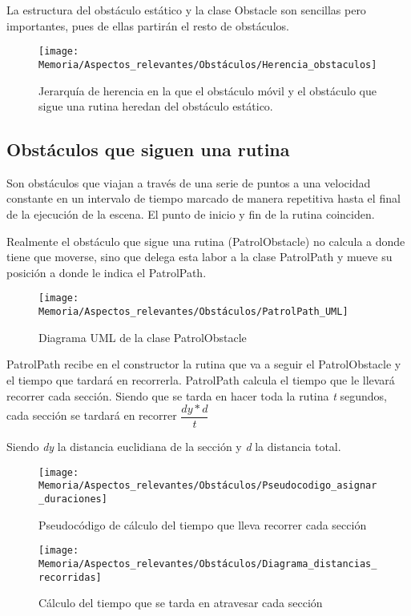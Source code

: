 La estructura del obstáculo estático y la clase Obstacle son sencillas pero importantes, pues de ellas partirán el resto de obstáculos.

\begin{figure}[h]
\centering
\texttt{[image: Memoria/Aspectos\_relevantes/Obstáculos/Herencia\_obstaculos]}
\caption{Jerarquía de herencia en la que el obstáculo móvil y el obstáculo que sigue una rutina heredan del obstáculo estático.}
\end{figure}

\subsection{Obstáculos que siguen una rutina}
Son obstáculos que viajan a través de una serie de puntos a una velocidad constante en un intervalo de tiempo marcado de manera repetitiva hasta el final de la ejecución de la escena. El punto de inicio y fin de la rutina coinciden. 

Realmente el obstáculo que sigue una rutina (PatrolObstacle) no calcula a donde tiene que moverse, sino que delega esta labor a la clase PatrolPath y mueve su posición a donde le indica el PatrolPath.

\begin{figure}[h]
\centering
\texttt{[image: Memoria/Aspectos\_relevantes/Obstáculos/PatrolPath\_UML]}
\caption{Diagrama UML de la clase PatrolObstacle}
\end{figure}

PatrolPath recibe en el constructor la rutina que va a seguir el PatrolObstacle y el tiempo que tardará en recorrerla. PatrolPath calcula el tiempo que le llevará recorrer cada sección. Siendo que se tarda en hacer toda la rutina \textit{t} segundos, cada sección se tardará en recorrer $\dfrac{dy*d}{t}$

Siendo \textit{dy} la distancia euclidiana de la sección y \textit{d} la distancia total.

\begin{figure}[h]
\centering
\texttt{[image: Memoria/Aspectos\_relevantes/Obstáculos/Pseudocodigo\_asignar\_duraciones]}
\caption{Pseudocódigo de cálculo del tiempo que lleva recorrer cada sección}
\end{figure}

\clearpage
\begin{figure}[h]
\centering
\texttt{[image: Memoria/Aspectos\_relevantes/Obstáculos/Diagrama\_distancias\_recorridas]}
\caption{Cálculo del tiempo que se tarda en atravesar cada sección}
\end{figure}

